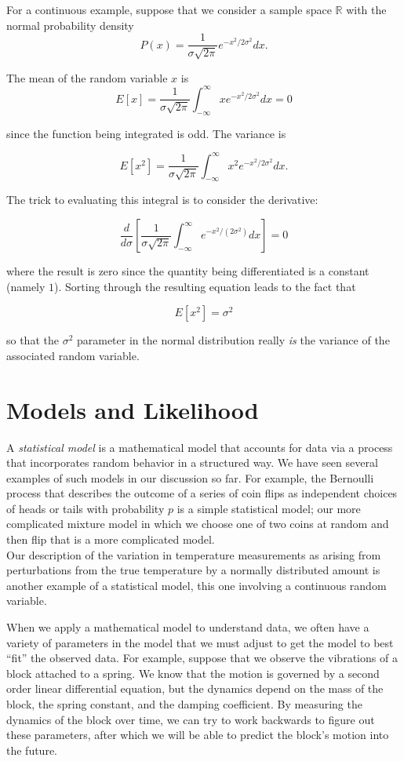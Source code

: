 \documentclass[
  oneside]{scrbook}
\begin{document}
For a continuous example, suppose that we consider a sample space
\(\mathbb{R}\) with the normal probability density \[
P(x) = \frac{1}{\sigma\sqrt{2\pi}}e^{-x^2/2\sigma^2}dx.
\]

The mean of the random variable \(x\) is \[
E[x] =\frac{1}{\sigma\sqrt{2\pi}}\int_{-\infty}^{\infty} xe^{-x^2/2\sigma^2}dx=0
\]

since the function being integrated is odd. The variance is

\[
E[x^2] = \frac{1}{\sigma\sqrt{2\pi}}\int_{-\infty}^{\infty} x^2e^{-x^2/2\sigma^2}dx.
\]

The trick to evaluating this integral is to consider the derivative:

\[
\frac{d}{d\sigma}\left[\frac{1}{\sigma\sqrt{2\pi}}\int_{-\infty}^{\infty}e^{-x^2/(2\sigma^2)}dx\right]=0
\]

where the result is zero since the quantity being differentiated is a
constant (namely \(1\)). Sorting through the resulting equation leads to
the fact that

\[
E[x^2]=\sigma^2
\]

so that the \(\sigma^2\) parameter in the normal distribution really
\emph{is} the variance of the associated random variable.

\hypertarget{models-and-likelihood}{%
\section{Models and Likelihood}\label{models-and-likelihood}}

A \emph{statistical model} is a mathematical model that accounts for
data via a process that incorporates random behavior in a structured
way. We have seen several examples of such models in our discussion so
far. For example, the Bernoulli process that describes the outcome of a
series of coin flips as independent choices of heads or tails with
probability \(p\) is a simple statistical model; our more complicated
mixture model in which we choose one of two coins at random and then
flip that is a more complicated model.\\
Our description of the variation in temperature measurements as arising
from perturbations from the true temperature by a normally distributed
amount is another example of a statistical model, this one involving a
continuous random variable.

When we apply a mathematical model to understand data, we often have a
variety of parameters in the model that we must adjust to get the model
to best ``fit'' the observed data. For example, suppose that we observe
the vibrations of a block attached to a spring. We know that the motion
is governed by a second order linear differential equation, but the
dynamics depend on the mass of the block, the spring constant, and the
damping coefficient. By measuring the dynamics of the block over time,
we can try to work backwards to figure out these parameters, after which
we will be able to predict the block's motion into the future.
\end{document}
